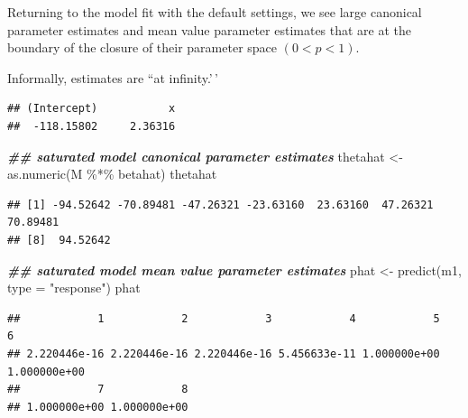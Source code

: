 \documentclass[
  ignorenonframetext,
]{beamer}
\newenvironment{Shaded}{\begin{snugshade}}{\end{snugshade}}
\newcommand{\AttributeTok}[1]{\textcolor[rgb]{0.77,0.63,0.00}{#1}}
\newcommand{\DocumentationTok}[1]{\textcolor[rgb]{0.56,0.35,0.01}{\textbf{\textit{#1}}}}
\newcommand{\FunctionTok}[1]{\textcolor[rgb]{0.00,0.00,0.00}{#1}}
\newcommand{\NormalTok}[1]{#1}
\newcommand{\OtherTok}[1]{\textcolor[rgb]{0.56,0.35,0.01}{#1}}
\newcommand{\SpecialCharTok}[1]{\textcolor[rgb]{0.00,0.00,0.00}{#1}}
\newcommand{\StringTok}[1]{\textcolor[rgb]{0.31,0.60,0.02}{#1}}
\begin{document}
\begin{frame}[fragile]{}
\protect\hypertarget{section-6}{}
Returning to the model fit with the default settings, we see large
canonical parameter estimates and mean value parameter estimates that
are at the boundary of the closure of their parameter space
\((0 < p < 1)\).

\vspace{12pt}

Informally, estimates are ``at infinity.'\,'

\vspace{12pt}
\tiny

\begin{Shaded}
\end{Shaded}

\begin{verbatim}
## (Intercept)           x 
##  -118.15802     2.36316
\end{verbatim}

\begin{Shaded}
\begin{Highlighting}[]
\DocumentationTok{\#\# saturated model canonical parameter estimates}
\NormalTok{thetahat }\OtherTok{\textless{}{-}} \FunctionTok{as.numeric}\NormalTok{(M }\SpecialCharTok{\%*\%}\NormalTok{ betahat)}
\NormalTok{thetahat}
\end{Highlighting}
\end{Shaded}

\begin{verbatim}
## [1] -94.52642 -70.89481 -47.26321 -23.63160  23.63160  47.26321  70.89481
## [8]  94.52642
\end{verbatim}

\begin{Shaded}
\begin{Highlighting}[]
\DocumentationTok{\#\# saturated model mean value parameter estimates}
\NormalTok{phat }\OtherTok{\textless{}{-}} \FunctionTok{predict}\NormalTok{(m1, }\AttributeTok{type =} \StringTok{"response"}\NormalTok{)}
\NormalTok{phat}
\end{Highlighting}
\end{Shaded}

\begin{verbatim}
##            1            2            3            4            5            6 
## 2.220446e-16 2.220446e-16 2.220446e-16 5.456633e-11 1.000000e+00 1.000000e+00 
##            7            8 
## 1.000000e+00 1.000000e+00
\end{verbatim}
\end{frame}
\end{document}
